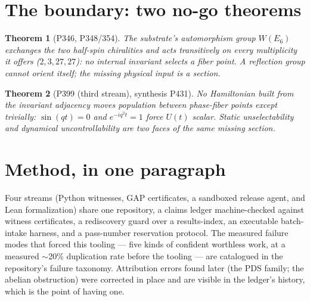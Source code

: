 \documentclass[11pt]{article}
\newtheorem{theorem}{Theorem}
\begin{document}
\section{The boundary: two no-go theorems}

\begin{theorem}[P346, P348/354]
The substrate's automorphism group $W(E_6)$ exchanges the two half-spin
chiralities and acts transitively on every multiplicity it offers
($2,3,27,27$): no internal invariant selects a fiber point. A reflection
group cannot orient itself; the missing physical input is a \emph{section}.
\end{theorem}

\begin{theorem}[P399 (third stream), synthesis P431]
No Hamiltonian built from the invariant adjacency moves population between
phase-fiber points except trivially: $\sin(qt)=0$ and $e^{-iq^2t}=1$ force
$U(t)$ scalar. Static unselectability and dynamical uncontrollability are two
faces of the same missing section.
\end{theorem}

\section{Method, in one paragraph}

Four streams (Python witnesses, GAP certificates, a sandboxed release agent,
and Lean formalization) share one repository, a claims ledger machine-checked
against witness certificates, a rediscovery guard over a results-index, an
executable batch-intake harness, and a pass-number reservation protocol. The
measured failure modes that forced this tooling --- five kinds of confident
worthless work, at a measured $\sim$20\% duplication rate before the tooling
--- are catalogued in the repository's failure taxonomy. Attribution errors
found later (the PDS family; the abelian obstruction) were corrected in place
and are visible in the ledger's history, which is the point of having one.
\end{document}
